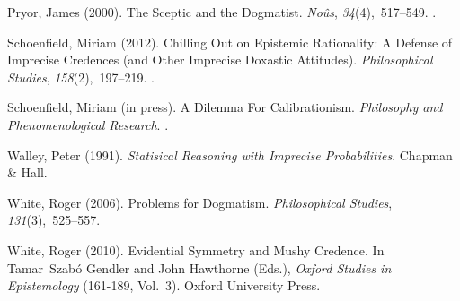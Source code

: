 \documentclass{ergoclass}
\begin{document}
\begin{thebibliography}{14}
Pryor, James (2000).
\newblock The Sceptic and the Dogmatist.
\newblock \emph{No\^{u}s}, \emph{34}(4),~517--549.
\newblock {}.

Schoenfield, Miriam (2012).
\newblock Chilling Out on Epistemic Rationality: A Defense of Imprecise
 Credences (and Other Imprecise Doxastic Attitudes).
\newblock \emph{Philosophical Studies}, \emph{158}(2),~197--219.
\newblock {}.

Schoenfield, Miriam (in press).
\newblock A Dilemma For Calibrationism.
\newblock \emph{Philosophy and Phenomenological Research}.
\newblock {}.

Walley, Peter (1991).
\newblock \emph{Statisical Reasoning with Imprecise Probabilities}.
\newblock Chapman \& Hall.

White, Roger (2006).
\newblock Problems for Dogmatism.
\newblock \emph{Philosophical Studies}, \emph{131}(3),~525--557.

White, Roger (2010).
\newblock Evidential Symmetry and Mushy Credence.
\newblock In Tamar~Szab{\'o} Gendler and John Hawthorne (Eds.), \emph{Oxford
  Studies in Epistemology} (161-189, Vol.~3). Oxford University Press.

\end{thebibliography}
\end{document}
